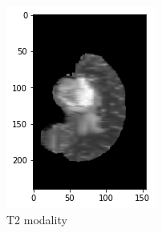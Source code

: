 \begin{figure}[H]
\begin{subfigure}[t]{.2\textwidth}
        \includegraphics[width=\linewidth]{chapters/04_segmentation/images/brats/2.png}
        \caption{T2 modality}
    \end{subfigure}%
    \begin{subfigure}[t]{.2\textwidth}
        \centering

\end{subfigure}
\end{figure}
